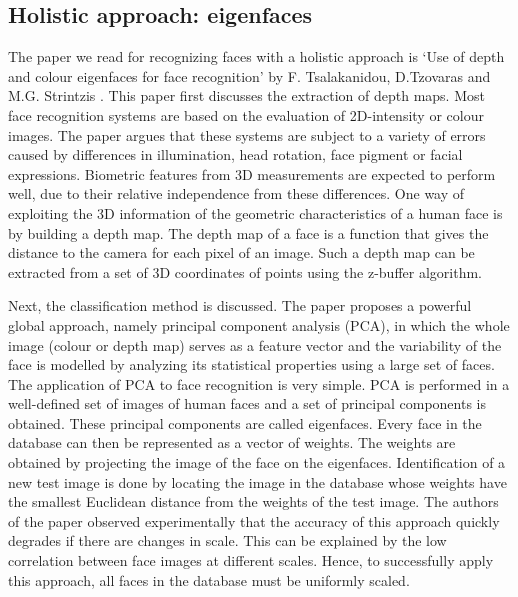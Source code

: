 \documentclass[]{article}
\begin{document}
\subsection{Holistic approach: eigenfaces}
The paper we read for recognizing faces with a holistic approach is `Use of depth and colour eigenfaces for face recognition' by F. Tsalakanidou, D.Tzovaras and M.G. Strintzis \cite{tsalakanidou2003use}.
This paper first discusses the extraction of depth maps. Most face recognition systems are based on the evaluation of 2D-intensity or colour images. The paper argues that these systems are subject to a variety of errors caused by differences in illumination, head rotation, face pigment or facial expressions. Biometric features from 3D measurements are expected to perform well, due to their relative independence from these differences. One way of exploiting the 3D information of the geometric characteristics of a human face is by building a depth map. The depth map of a face is a function that gives the distance to the camera for each pixel of an image. Such a depth map can be extracted from a set of 3D coordinates of points using the z-buffer algorithm.

Next, the classification method is discussed. The paper proposes a powerful global approach, namely principal component analysis (PCA), in which the whole image (colour or depth map) serves as a feature vector and the variability of the face is modelled by analyzing its statistical properties using a large set of faces. The application of PCA to face recognition is very simple. PCA is performed in a well-defined set of images of human faces and a set of principal components is obtained. These principal components are called eigenfaces. Every face in the database can then be represented as a vector of weights. The weights are obtained by projecting the image of the face on the eigenfaces. Identification of a new test image is done by locating the image in the database whose weights have the smallest Euclidean distance from the weights of the test image. The authors of the paper observed experimentally that the accuracy of this approach quickly degrades if there are changes in scale. This can be explained by the low correlation between face images at different scales. Hence, to successfully apply this approach, all faces in the database must be uniformly scaled.
\end{document}
